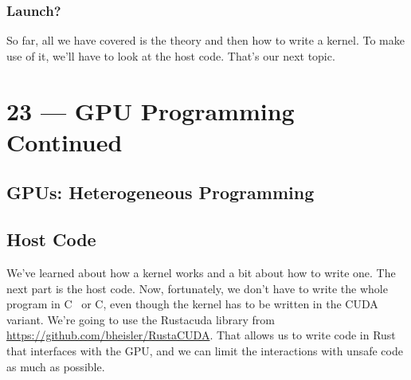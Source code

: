 \documentclass[a4paper]{report}
\newcommand{\CPP}{C\nolinebreak\hspace{-.05em}\raisebox{.4ex}{\tiny\bf +}\nolinebreak\hspace{-.10em}\raisebox{.4ex}{\tiny\bf +}}
\def\CPP{{C\nolinebreak[4]\hspace{-.05em}\raisebox{.4ex}{\tiny\bf ++}}}
\begin{document}
\subsection*{Launch?}

So far, all we have covered is the theory and then how to write a kernel. To make use of it, we'll have to look at the host code. That's our next topic. 










\chapter*{23 --- GPU Programming Continued}


\section*{GPUs: Heterogeneous Programming}

\section*{Host Code}
We've learned about how a kernel works and a bit about how to write one. The next part is the host code. Now, fortunately, we don't have to write the whole program in \CPP~ or C, even though the kernel has to be written in the CUDA variant. We're going to use the Rustacuda library from \url{https://github.com/bheisler/RustaCUDA}. That allows us to write code in Rust that interfaces with the GPU, and we can limit the interactions with unsafe code as much as possible.
 
\end{document}
